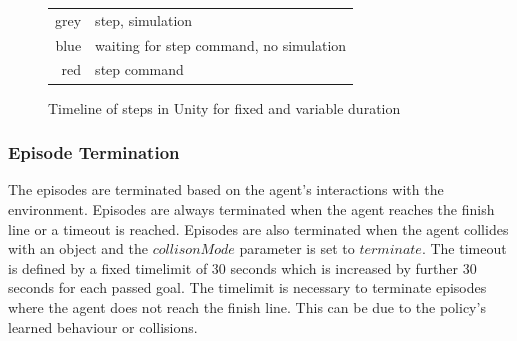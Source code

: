 \begin{figure}[!ht]
    \begin{tabular}{r@{: }l}
        grey & step, simulation                                    \\
        blue & waiting for step command, no simulation \\
        red  & step command
    \end{tabular}
    \caption{Timeline of steps in Unity for fixed and variable duration}
    \label{fig:unity_timeline_steps_duration}
\end{figure}



\subsubsection{Episode Termination}
\label{time_limit}

The episodes are terminated based on the agent's interactions with the environment. Episodes are always terminated when the agent reaches the finish line or a timeout is reached. Episodes are also terminated when the agent collides with an object and the $collisonMode$ parameter is set to $terminate$.
The timeout is defined by a fixed timelimit of 30 seconds which is increased by further 30 seconds for each passed goal. The timelimit is necessary to terminate episodes where the agent does not reach the finish line. This can be due to the policy's learned behaviour or collisions.

